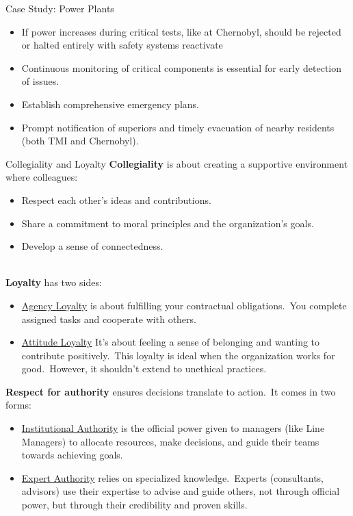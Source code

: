 \documentclass[11pt]{beamer}
\begin{document}
\begin{frame}[t,allowframebreaks]{Case Study: Power Plants}
\begin{itemize}
            \item If power increases during critical tests, like at Chernobyl, should be rejected or halted entirely
            with safety systems reactivate
            \item Continuous monitoring of critical components is essential for early detection of issues.
            \item Establish comprehensive emergency plans.
            \item Prompt notification of superiors and timely evacuation of nearby residents (both TMI and Chernobyl).
        \end{itemize}
    \end{frame}

    \begin{frame}[t,allowframebreaks]{Collegiality and Loyalty}
        \textbf{Collegiality} is about creating a supportive environment where colleagues:\\[5pt]
        \begin{itemize}
            \item \alert{Respect} each other's ideas and contributions.
            \item Share a \alert{commitment} to moral principles and the organization's goals.
            \item Develop a sense of \alert{connectedness}.
        \end{itemize}
        \\[10pt]
        \textbf{Loyalty} has two sides:\\[5pt]
        \begin{itemize}
            \item \ul{Agency Loyalty} is about fulfilling your contractual obligations.\ You complete assigned
            tasks and
            cooperate with others.
            \item \ul{Attitude Loyalty} It's about feeling a sense of belonging and wanting to contribute
            positively.\ This loyalty is ideal when the organization works for good.\ However, it shouldn't extend to
            unethical practices.
        \end{itemize}

        \framebreak

        \textbf{Respect for authority} ensures decisions translate to action.\ It comes in two forms:\\[5pt]
        \begin{itemize}
            \item \ul{Institutional Authority} is the official power given to managers (like Line Managers) to
            allocate resources, make decisions, and guide their teams towards achieving goals.
            \item \ul{Expert Authority} relies on specialized knowledge.\ Experts (consultants, advisors) use
            their expertise to advise and guide others, not through official power, but through their credibility and
            proven skills.
        \end{itemize}
    \end{frame}
\end{document}
